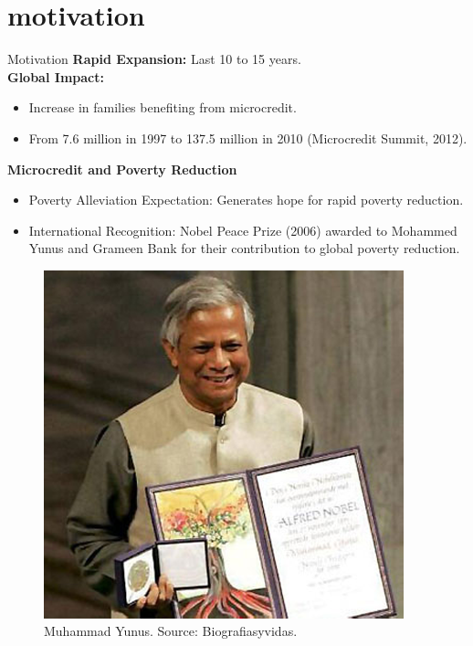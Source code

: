 \documentclass[10pt]{beamer}
\begin{document}
\section{motivation}
\begin{frame}{Motivation}
\justifying
\textbf{Rapid Expansion:} Last 10 to 15 years.\\
\textbf{Global Impact:}
\begin{itemize}
\item Increase in families benefiting from microcredit.\\
\item From 7.6 million in 1997 to 137.5 million in 2010 (Microcredit Summit, 2012).
\end{itemize}

\textbf{Microcredit and Poverty Reduction}
\begin{itemize}
    \justifying
    \item Poverty Alleviation Expectation: Generates hope for rapid poverty reduction.\\
\item International Recognition: Nobel Peace Prize (2006) awarded to Mohammed Yunus and Grameen Bank for their contribution to global poverty reduction.
\end{itemize}

\begin{figure}[H]
\centering
\includegraphics[scale=0.2]{figuras/yunus_nobel_01}
{\footnotesize
\caption{Muhammad Yunus. Source: Biografiasyvidas.}
}
\label{figura02}
\end{figure}

\end{frame}
\end{document}
